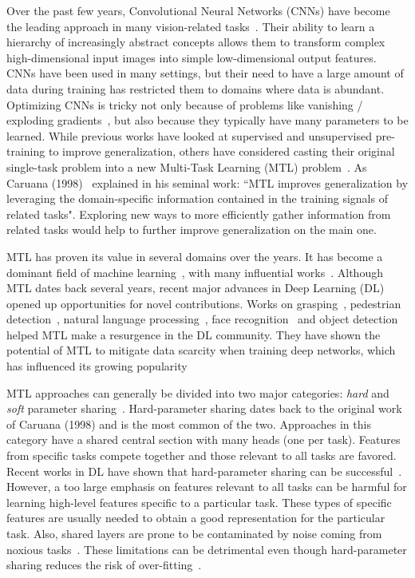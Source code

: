 \documentclass[runningheads]{llncs}
\newcommand{\citep}{\cite}
\newcommand{\citet}{\cite}
\begin{document}
Over the past few years, Convolutional Neural Networks (CNNs) have become the leading approach in many vision-related tasks~\citep{krizhevsky2012imagenet}. Their ability to learn a hierarchy of increasingly abstract concepts allows them to transform complex high-dimensional input images into simple low-dimensional output features. CNNs have been used in many settings, but their need to have a large amount of data during training has restricted them to domains where data is abundant. Optimizing CNNs is tricky not only because of problems like vanishing / exploding gradients~\citep{hochreiter1998vanishing}, but also because they typically have many parameters to be learned. While previous works have looked at supervised and unsupervised pre-training to improve generalization, others have considered casting their original single-task problem into a new Multi-Task Learning (MTL) problem~\citet{zhang2017survey}. As Caruana (1998)~\citet{caruana1998multitask} explained in his seminal work: ``MTL improves generalization by leveraging the domain-specific information contained in the training signals of related tasks". Exploring new ways to more efficiently gather information from related tasks would help to further improve generalization on the main one.


MTL has proven its value in several domains over the years. It has become a dominant field of machine learning~\citep{zhang2014review}, with many influential works~\citep{evgeniou2004regularized}. Although MTL dates back several years, recent major advances in Deep Learning (DL) opened up opportunities for novel contributions. Works on grasping~\citep{pinto2017learning}, pedestrian detection~\citep{tian2015pedestrian}, natural language processing~\citep{liu2015representation}, face recognition~\citep{yim2015rotating}\citep{yin2017multi} and object detection~\citep{misra2016cross} helped MTL make a resurgence in the DL community. They have shown the potential of MTL to mitigate data scarcity when training deep networks, which has influenced its growing popularity

MTL approaches can generally be divided into two major categories: \emph{hard} and \emph{soft} parameter sharing~\citep{DBLP:journals/corr/Ruder17a}. Hard-parameter sharing dates back to the original work of Caruana (1998) and is the most common of the two. Approaches in this category have a shared central section with many heads (one per task). Features from specific tasks compete together and those relevant to all tasks are favored. Recent works in DL have shown that hard-parameter sharing can be successful~\citep{ranjan2016hyperface}\citep{zhang2014facial}\citep{pinto2017learning}\citep{yin2017multi}. However, a too large emphasis on features relevant to all tasks can be harmful for learning high-level features specific to a particular task. These types of specific features are usually needed to obtain a good representation for the particular task. Also, shared layers are prone to be contaminated by noise coming from noxious tasks~\citep{liu2017adversarial}. These limitations can be detrimental even though hard-parameter sharing reduces the risk of over-fitting~\citep{baxter1997bayesian}.
\end{document}
